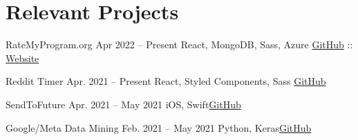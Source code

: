
\newif\ifshowchips
\showchipsfalse

\newcommand{\javascript}{\ifshowchips \fcolorbox{js}{js}{\bf \scriptsize JS} \fi}
\newcommand{\python}{\ifshowchips \fcolorbox{py}{py}{\bf \scriptsize \textcolor{white}{Python}} \fi}
\newcommand{\swift}{\ifshowchips \fcolorbox{swift}{swift}{\bf \scriptsize Swift} \fi}
\newcommand{\vbnet}{\ifshowchips \fcolorbox{vb}{vb}{\bf \scriptsize \textcolor{white}{VB.NET}} \fi}
\newcommand{\cpp}{\ifshowchips \fcolorbox{cpp}{cpp}{\bf \scriptsize C++} \fi}

\section{Relevant Projects}
  \resumeSubHeadingListStart
  
    \ifwebdev
    \resumeSubheading
      {RateMyProgram.org \javascript}
      {Apr 2022 -- Present}
      {React, MongoDB, Sass, Azure}
      {\href{https://github.com/yrahul3910/ratemyprogram}{GitHub} :: \href{https://ratemyprogram.org/}{Website}}
    \fi
  
    \ifwebdev
    \resumeSubheading
      {Reddit Timer \javascript}
      {Apr. 2021 -- Present}
      {React, Styled Components, Sass}
      {\href{https://github.com/profydev/reddit-timer-yrahul3910}{GitHub}}
    \fi
  
    \ifios
    \resumeSubheading
      {SendToFuture \swift}{Apr. 2021 -- May 2021}
      {iOS, Swift}{\href{https://github.com/yrahul3910/send-to-future}{GitHub}}
    \fi
      
    \ifml
    \resumeSubheading
      {Google/Meta Data Mining \python}{Feb. 2021 -- May 2021}
      {Python, Keras}{\href{https://github.com/yrahul3910/google-takeout-data-mining}{GitHub}}
    \fi
      
